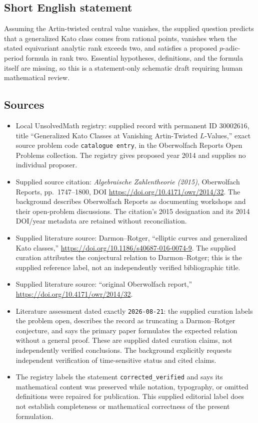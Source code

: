 \documentclass[11pt]{article}
\begin{document}
\subsection{Short English statement}
Assuming the Artin-twisted central value vanishes, the supplied question predicts that a generalized Kato class comes from rational points, vanishes when the stated equivariant analytic rank exceeds two, and satisfies a proposed $p$-adic-period formula in rank two. Essential hypotheses, definitions, and the formula itself are missing, so this is a statement-only schematic draft requiring human mathematical review.
\subsection{Sources}
\begin{itemize}
\item Local UnsolvedMath registry: supplied record with permanent ID $30002616$, title ``Generalized Kato Classes at Vanishing Artin-Twisted $L$-Values,'' exact source problem code \texttt{catalogue entry}, in the Oberwolfach Reports Open Problems collection. The registry gives proposed year 2014 and supplies no individual proposer.
\item Supplied source citation: \emph{Algebraische Zahlentheorie (2015)}, Oberwolfach Reports, pp.~1747--1800, DOI \url{https://doi.org/10.4171/owr/2014/32}. The background describes Oberwolfach Reports as documenting workshops and their open-problem discussions. The citation's 2015 designation and its 2014 DOI/year metadata are retained without reconciliation.
\item Supplied literature source: Darmon--Rotger, ``elliptic curves and generalized Kato classes,'' \url{https://doi.org/10.1186/s40687-016-0074-9}. The supplied curation attributes the conjectural relation to Darmon--Rotger; this is the supplied reference label, not an independently verified bibliographic title.
\item Supplied literature source: ``original Oberwolfach report,'' \url{https://doi.org/10.4171/owr/2014/32}.
\item Literature assessment dated exactly \texttt{2026-08-21}: the supplied curation labels the problem open, describes the record as truncating a Darmon--Rotger conjecture, and says the primary paper formulates the expected relation without a general proof. These are supplied dated curation claims, not independently verified conclusions. The background explicitly requests independent verification of time-sensitive status and cited claims.
\item The registry labels the statement \texttt{corrected\_verified} and says its mathematical content was preserved while notation, typography, or omitted definitions were repaired for publication. This supplied editorial label does not establish completeness or mathematical correctness of the present formulation.
\end{itemize}
\end{document}
